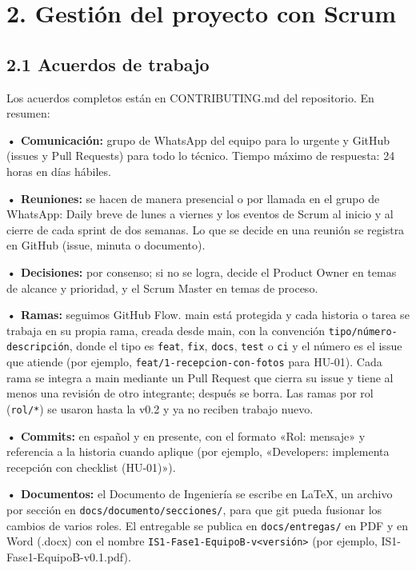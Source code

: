 \section{2. Gestión del proyecto con
Scrum}\label{gestiuxf3n-del-proyecto-con-scrum}

\subsection{2.1 Acuerdos de trabajo}\label{acuerdos-de-trabajo}

Los acuerdos completos están en CONTRIBUTING.md del repositorio. En
resumen:

\textbf{• Comunicación:} grupo de WhatsApp del equipo para lo
urgente y GitHub (issues y Pull Requests) para todo lo técnico. Tiempo
máximo de respuesta: 24 horas en días hábiles.

\textbf{• Reuniones:} se hacen de manera presencial o por llamada en el
grupo de WhatsApp: Daily breve de lunes a viernes y los eventos de Scrum
al inicio y al cierre de cada sprint de dos semanas. Lo que se decide en
una reunión se registra en GitHub (issue, minuta o documento).

\textbf{• Decisiones:} por consenso; si no se logra, decide el Product
Owner en temas de alcance y prioridad, y el Scrum Master en temas de
proceso.

\textbf{• Ramas:} seguimos GitHub Flow. main está protegida y cada
historia o tarea se trabaja en su propia rama, creada desde main, con la
convención \texttt{tipo/número-descripción}, donde el tipo es
\texttt{feat}, \texttt{fix}, \texttt{docs}, \texttt{test} o \texttt{ci} y
el número es el issue que atiende (por ejemplo,
\texttt{feat/1-recepcion-con-fotos} para HU-01). Cada rama se integra a
main mediante un Pull Request que cierra su issue y tiene al menos una
revisión de otro integrante; después se borra. Las ramas por rol
(\texttt{rol/*}) se usaron hasta la v0.2 y ya no reciben trabajo nuevo.

\textbf{• Commits:} en español y en presente, con el formato
«Rol: mensaje» y referencia a la historia cuando aplique (por ejemplo,
«Developers: implementa recepción con checklist (HU-01)»).

\textbf{• Documentos:} el Documento de Ingeniería se escribe en LaTeX,
un archivo por sección en \texttt{docs/documento/secciones/}, para que
git pueda fusionar los cambios de varios roles. El entregable se publica en
\texttt{docs/entregas/} en PDF y en Word (.docx) con el nombre
\texttt{IS1-Fase1-EquipoB-v<versión>} (por ejemplo, IS1-Fase1-EquipoB-v0.1.pdf).


